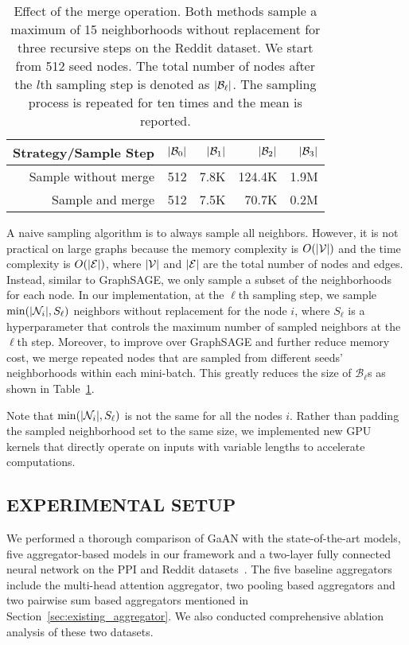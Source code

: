 \documentclass{article}
\DeclarePairedDelimiter\abs{\lvert}{\rvert}\DeclarePairedDelimiter\norm{\lVert}{\rVert}
\begin{document}
	
	\begin{table}[tb!]
		\centering
		\caption{Effect of the merge operation. Both methods sample a maximum of 15 neighborhoods without replacement for three recursive steps on the Reddit dataset. We start from 512 seed nodes. The total number of nodes after the $l$th sampling step is denoted as $\abs{\mathcal{B}_\ell}$. The sampling process is repeated for ten times and the mean is reported.}
		\begin{tabular}{|r | rrrr|}
			\hline
			Strategy/Sample Step  & $\abs{\mathcal{B}_0}$ & $\abs{\mathcal{B}_1}$ & $\abs{\mathcal{B}_2}$ & $\abs{\mathcal{B}_3}$ \\
			\hline
			Sample without merge & 512 & 7.8K & 124.4K & 1.9M   \\ Sample and merge     & 512 & 7.5K & 70.7K  & 0.2M    \\  \hline
		\end{tabular}
\label{tab:sample_and_merge}
	\end{table}
	A naive sampling algorithm is to always sample all neighbors. However, it is not practical on large graphs because the memory complexity is $O(\abs{\mathcal{V}})$ and the time complexity is $O(\abs{\mathcal{E}})$, where $\abs{\mathcal{V}}$ and $\abs{\mathcal{E}}$ are the total number of nodes and edges. Instead, similar to GraphSAGE, we only sample a subset of the neighborhoods for each node. In our implementation, at the $\ell$th sampling step, we sample $\min(\abs{\mathcal{N}_i}, S_\ell)$ neighbors without replacement for the node $i$, where $S_\ell$ is a hyperparameter that controls the maximum number of sampled neighbors at the $\ell$th step. Moreover, to improve over GraphSAGE and further reduce memory cost, we merge repeated nodes that are sampled from different seeds' neighborhoods within each mini-batch. This greatly reduces the size of $\mathcal{B}_\ell$s as shown in Table~\ref{tab:sample_and_merge}.
	
	Note that $\min(\abs{\mathcal{N}_i}, S_\ell)$ is not the same for all the nodes $i$. Rather than padding the sampled neighborhood set to the same size, we implemented new GPU kernels that directly operate on inputs with variable lengths to accelerate computations.
	
\subsection{EXPERIMENTAL SETUP}\label{sec:exp}
	
	We performed a thorough comparison of GaAN with the state-of-the-art models, five aggregator-based models in our framework and a two-layer fully connected neural network on the PPI and Reddit datasets~\citep{hamilton2017inductive}. The five baseline aggregators include the multi-head attention aggregator, two pooling based aggregators and two pairwise sum based aggregators mentioned in Section~\ref{sec:existing_aggregator}. We also conducted comprehensive ablation analysis of these two datasets.
	
\end{document}
